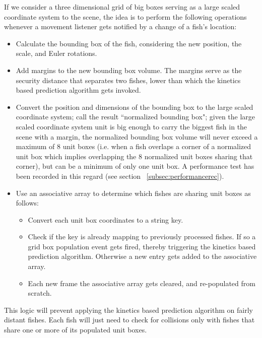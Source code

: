 If we consider a three dimensional grid of big boxes serving as a large scaled coordinate system to the scene, the idea is to perform the following operations whenever a movement listener gets notified by a change of a fish's location:
\begin{itemize}

\item Calculate the bounding box of the fish, considering the new position, the scale, and Euler rotations.

\item Add margins to the new bounding box volume. The margins serve as the security distance that separates two fishes, lower than which the kinetics based prediction algorithm gets invoked.

\item Convert the position and dimensions of the bounding box to the large scaled coordinate system; call the result ``normalized bounding box"; given the large scaled coordinate system unit is big enough to carry the biggest fish in the scene with a margin, the normalized bounding box volume will never exceed a maximum of 8 unit boxes (i.e. when a fish overlaps a corner of a normalized unit box which implies overlapping the 8 normalized unit boxes sharing that corner), but can be a minimum of only one unit box. A performance test has been recorded in this regard (see section ~\ref{subsec:performancerec}).

\item Use an associative array to determine which fishes are sharing unit boxes as follows:

\begin{itemize}

\item Convert each unit box coordinates to a string key.

\item Check if the key is already mapping to previously processed fishes. If so a grid box population event gets fired, thereby triggering the kinetics based prediction algorithm. Otherwise a new entry gets added to the associative array. 

\item Each new frame the associative array gets cleared, and re-populated from scratch.

\end{itemize}
\end{itemize}

This logic will prevent applying the kinetics based prediction algorithm on fairly distant fishes. Each fish will just need to check for collisions only with fishes that share one or more of its populated unit boxes.\\

